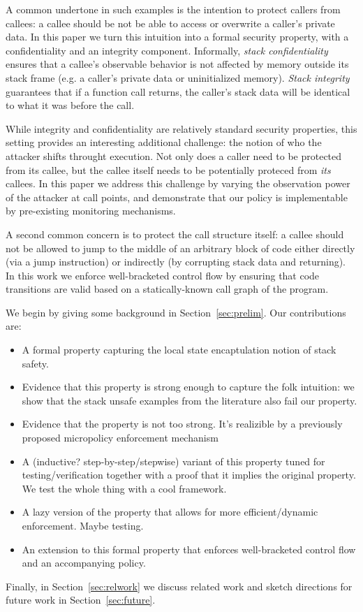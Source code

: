 \documentclass[acmsmall,review,anonymous]{acmart}\settopmatter{printfolios=true,printccs=false,printacmref=false}
\begin{document}
A common undertone in such examples is the intention to protect
callers from callees: a callee should be not be able to access or
overwrite a caller's private data. In this paper we turn this
intuition into a formal security property, with a confidentiality and
an integrity component.
%
Informally, {\em stack confidentiality} ensures that a callee's
observable behavior is not affected by memory outside its stack frame
(e.g. a caller's private data or uninitialized memory).  {\em Stack
  integrity} guarantees that if a function call returns, the caller's
stack data will be identical to what it was before the call.

While integrity and confidentiality are relatively standard security
properties, this setting provides an interesting additional challenge:
the notion of who the attacker shifts throught execution. Not only
does a caller need to be protected from its callee, but the callee
itself needs to be potentially proteced from {\em its} callees.  In
this paper we address this challenge by varying the observation power
of the attacker at call points, and demonstrate that our policy is
implementable by pre-existing monitoring mechanisms.

%
A second common concern is to protect the call structure itself: a
callee should not be allowed to jump to the middle of an arbitrary
block of code either directly (via a jump instruction) or indirectly
(by corrupting stack data and returning). In this work we enforce
well-bracketed control flow by ensuring that code transitions are
valid based on a statically-known call graph of the
program. 

We begin by giving some background in Section~\ref{sec:prelim}.
Our contributions are:
\begin{itemize}
\item A formal property capturing the local state encaptulation
  notion of stack safety.
\item Evidence that this property is strong enough to capture the folk
intuition: we show that the stack
  unsafe examples from the literature also fail our property.
\item Evidence that the property is not too strong. It's realizible by
  a previously proposed  micropolicy enforcement mechanism 
\item A (inductive? step-by-step/stepwise) variant of this property
  tuned for testing/verification together with a proof that it implies
  the original property.  We test the whole thing with a cool
  framework.
\item A lazy version of the property that allows for more efficient/dynamic enforcement.
  Maybe testing.
\item An extension to this formal property that enforces well-bracketed
  control flow and an accompanying policy.
\end{itemize}
Finally, in Section~\ref{sec:relwork} we discuss related work and
sketch directions for future work in Section~\ref{sec:future}.
\end{document}

